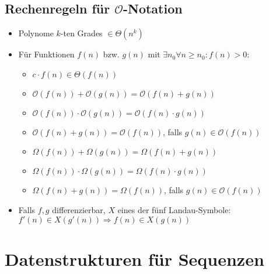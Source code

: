\documentclass[12pt,a4paper]{article}
\begin{document}
\subsection{Rechenregeln für $\mathcal{O}$-Notation}
\begin{itemize}
\item Polynome $k$-ten Grades $\in\Theta(n^k)$
\item Für Funktionen $f(n)$ bzw. $g(n)$ mit $\exists n_0 \forall n\geq n_0 : f(n) > 0$: \begin{itemize}
\item $c\cdot f(n)\in\Theta(f(n))$
\item $\mathcal{O}(f(n))+\mathcal{O}(g(n))=\mathcal{O}(f(n)+g(n))$
\item $\mathcal{O}(f(n))\cdot\mathcal{O}(g(n))=\mathcal{O}(f(n)\cdot g(n))$
\item $\mathcal{O}(f(n)+g(n))=\mathcal{O}(f(n))$, falls $g(n)\in\mathcal{O}(f(n))$
\item $\Omega(f(n))+\Omega(g(n))=\Omega(f(n)+g(n))$
\item $\Omega(f(n))\cdot\Omega(g(n))=\Omega(f(n)\cdot g(n))$
\item $\Omega(f(n)+g(n))=\Omega(f(n))$, falls $g(n)\in\mathcal{O}(f(n))$
\end{itemize}
\item Falls $f,g$ differenzierbar, $X$ eines der fünf Landau-Symbole:\\
 $f'(n)\in X(g'(n))\Rightarrow f(n)\in X(g(n))$
\end{itemize}
\section{Datenstrukturen für Sequenzen}
\end{document}
